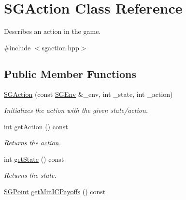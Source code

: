 \hypertarget{classSGAction}{\section{S\-G\-Action Class Reference}
\label{classSGAction}
}


Describes an action in the game.  




{\ttfamily \#include $<$sgaction.\-hpp$>$}

\subsection*{Public Member Functions}
\begin{DoxyCompactItemize}
\item 
\hypertarget{classSGAction_a763b30d91b4ac060895b3af2731d097c}{\hyperlink{classSGAction_a763b30d91b4ac060895b3af2731d097c}{S\-G\-Action} (const \hyperlink{classSGEnv}{S\-G\-Env} \&\-\_\-env, int \-\_\-state, int \-\_\-action)}\label{classSGAction_a763b30d91b4ac060895b3af2731d097c}

\begin{DoxyCompactList}\small\item\em Initializes the action with the given state/action. \end{DoxyCompactList}\item 
\hypertarget{classSGAction_a669309713ab99e375da193bbfa6fc586}{int \hyperlink{classSGAction_a669309713ab99e375da193bbfa6fc586}{get\-Action} () const }\label{classSGAction_a669309713ab99e375da193bbfa6fc586}

\begin{DoxyCompactList}\small\item\em Returns the action. \end{DoxyCompactList}\item 
\hypertarget{classSGAction_a279af062730a81a022177740112c5f2d}{int \hyperlink{classSGAction_a279af062730a81a022177740112c5f2d}{get\-State} () const }\label{classSGAction_a279af062730a81a022177740112c5f2d}

\begin{DoxyCompactList}\small\item\em Returns the state. \end{DoxyCompactList}\item 
\hypertarget{classSGAction_aa3758e5365a78ee447ec41914cc7bb99}{\hyperlink{classSGPoint}{S\-G\-Point} \hyperlink{classSGAction_aa3758e5365a78ee447ec41914cc7bb99}{get\-Min\-I\-C\-Payoffs} () const }\label{classSGAction_aa3758e5365a78ee447ec41914cc7bb99}


\end{DoxyCompactItemize}
